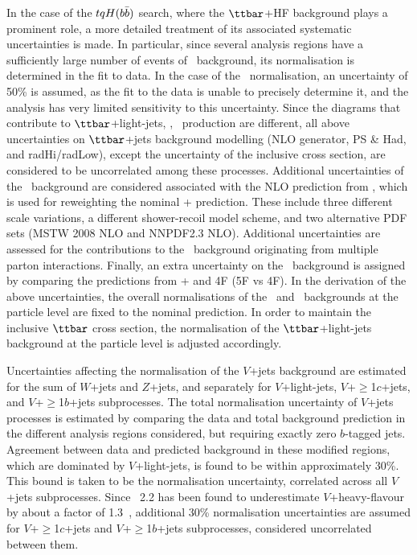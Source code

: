In the case of the $tqH(b\bar{b})$ search, where the $\ttbar$+HF background plays a prominent role, a more 
detailed treatment of its associated systematic uncertainties is made. In particular, since several analysis 
regions have a sufficiently large number of events of \ttbin\ background, its normalisation is 
determined in the fit to data.
In the case of the \ttcin\ normalisation, an uncertainty of 50\% is assumed, as the fit to the data is unable 
to precisely determine it, and the analysis has very limited sensitivity to this uncertainty.
Since the diagrams that contribute to $\ttbar$+light-jets, \ttcin, \ttbin\
production are different, all above uncertainties on $\ttbar$+jets
background modelling (NLO generator, PS \& Had, and radHi/radLow), except the uncertainty of the inclusive cross section, are
considered to be uncorrelated among these processes.
Additional uncertainties of the \ttbin\ background are considered associated with the NLO prediction from {\ShOL}, 
which is used for reweighting the nominal {\powheg}+{\pythiaeight} prediction. 
These include three different scale variations, a different shower-recoil model scheme, and 
two alternative PDF sets (MSTW 2008 NLO and NNPDF2.3 NLO). Additional uncertainties are assessed for
the contributions to the \ttbin\ background originating from multiple parton interactions.
Finally, an extra uncertainty on the \ttbin\ background is assigned by 
comparing
the predictions from {\powheg}+{\pythiaeight} and {\ShOL} 4F (5F vs 4F).
In the derivation of the above uncertainties, the overall normalisations of the \ttcin\ and \ttbin\ backgrounds 
at the particle level are fixed to the nominal prediction. In order to maintain the inclusive $\ttbar$ cross section, 
the normalisation of the $\ttbar$+light-jets background at the particle level is adjusted accordingly.

Uncertainties affecting the normalisation of the $V$+jets background are estimated for the sum
of $W$+jets and $Z$+jets, and separately for $V$+light-jets, $V$+$\geq$1$c$+jets, and $V$+$\geq$1$b$+jets subprocesses.
The total normalisation uncertainty of $V$+jets processes is estimated by comparing the data and total background prediction in 
the different analysis regions considered, but requiring exactly zero $b$-tagged jets. Agreement between data and predicted background 
in these modified regions, which are dominated by $V$+light-jets, is found to be within approximately 30\%. This bound is taken to 
be the normalisation uncertainty, correlated across all $V$+jets subprocesses. 
Since {\sherpa}~2.2 has been found to underestimate $V$+heavy-flavour by about a factor
of 1.3~\cite{Aaboud:2017xsd}, additional 30\% normalisation uncertainties are assumed for $V$+$\geq$1$c$+jets and $V$+$\geq$1$b$+jets
subprocesses, considered uncorrelated between them.


